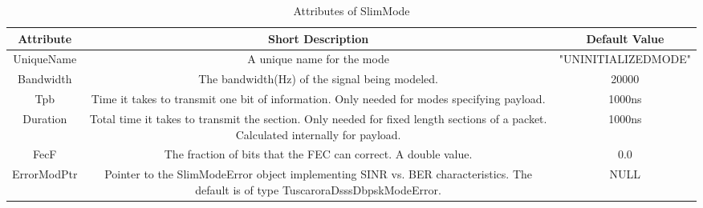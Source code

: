  \begin{longtable}{ | c | c | c |}

\caption{Attributes of SlimMode}\label{table:SlimModeTable}	\\
 
     \hline
  \textbf{Attribute} & \textbf{Short Description} & \textbf{Default Value} \\ \hline
 
     
    
 UniqueName & \parbox[][][t]{7cm}{\vspace{6pt}\raggedright A unique name for the mode\vspace{6pt}} & 
                   "UNINITIALIZEDMODE" \\ \hline 

 Bandwidth &  \parbox[][][t]{7cm}{\vspace{6pt}\raggedright The bandwidth(Hz) of the signal being modeled.\vspace{6pt}} & 
                   20000 \\ \hline 
                   
 Tpb & \parbox{7cm}{\vspace{6pt}\raggedright Time it takes to transmit one bit of information. Only needed for modes specifying payload.\vspace{6pt}} & 
                   1000ns \\ \hline 	
                   
Duration & \parbox{7cm}{\vspace{6pt}\raggedright Total time it takes to transmit the section. Only needed for fixed length sections of a packet. Calculated internally for payload.\vspace{6pt}} & 
              1000ns\\ \hline            
  
FecF & \parbox{7cm}{\vspace{6pt}\raggedright The fraction of bits that the FEC can correct. A double value.\vspace{6pt}} & 
                  0.0\\ \hline 	
                                   
ErrorModPtr & \parbox{7cm}{\vspace{6pt}\raggedright Pointer to the SlimModeError object implementing SINR vs. BER characteristics. The default is of type TuscaroraDsssDbpskModeError.\vspace{6pt}} & 
               NULL\\ \hline       
               




       							  		
	   
 \end{longtable}   
